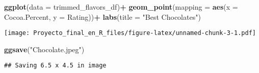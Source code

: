 \documentclass[
]{article}
\newenvironment{Shaded}{\begin{snugshade}}{\end{snugshade}}
\newcommand{\AttributeTok}[1]{\textcolor[rgb]{0.13,0.29,0.53}{#1}}
\newcommand{\FunctionTok}[1]{\textcolor[rgb]{0.13,0.29,0.53}{\textbf{#1}}}
\newcommand{\NormalTok}[1]{#1}
\newcommand{\SpecialCharTok}[1]{\textcolor[rgb]{0.81,0.36,0.00}{\textbf{#1}}}
\newcommand{\StringTok}[1]{\textcolor[rgb]{0.31,0.60,0.02}{#1}}
\begin{document}
\begin{Shaded}
\begin{Highlighting}[]
\FunctionTok{ggplot}\NormalTok{(}\AttributeTok{data =}\NormalTok{ trimmed\_flavors\_df)}\SpecialCharTok{+}
  \FunctionTok{geom\_point}\NormalTok{(}\AttributeTok{mapping =} \FunctionTok{aes}\NormalTok{(}\AttributeTok{x =}\NormalTok{ Cocoa.Percent, }\AttributeTok{y =}\NormalTok{ Rating))}\SpecialCharTok{+}
  \FunctionTok{labs}\NormalTok{(}\AttributeTok{title =} \StringTok{"Best Chocolates"}\NormalTok{)}
\end{Highlighting}
\end{Shaded}

\texttt{[image: Proyecto\_final\_en\_R\_files/figure-latex/unnamed-chunk-3-1.pdf]}

\begin{Shaded}
\begin{Highlighting}[]
  \FunctionTok{ggsave}\NormalTok{(}\StringTok{"Chocolate.jpeg"}\NormalTok{)}
\end{Highlighting}
\end{Shaded}

\begin{verbatim}
## Saving 6.5 x 4.5 in image
\end{verbatim}
\end{document}

